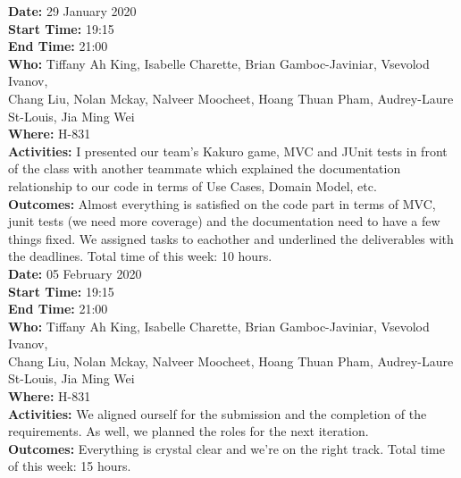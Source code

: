 \documentclass[12pt]{article}
\begin{document}
{\bf Date:} 29 January 2020\\
{\bf Start Time:} 19:15\\
{\bf End Time:} 21:00\\
{\bf Who:} Tiffany Ah King, Isabelle Charette, Brian Gamboc-Javiniar, Vsevolod Ivanov,\\
Chang Liu, Nolan Mckay, Nalveer Moocheet, Hoang Thuan Pham, Audrey-Laure St-Louis, Jia Ming Wei\\
{\bf Where:} H-831\\
{\bf Activities:} I presented our team's Kakuro game, MVC and JUnit tests in front of the class with another teammate which explained the documentation relationship to our code in terms of Use Cases, Domain Model, etc.\\
{\bf Outcomes:} Almost everything is satisfied on the code part in terms of MVC, junit tests (we need more coverage) and the documentation need to have a few things fixed. We assigned tasks to eachother and underlined the deliverables with the deadlines. Total time of this week: 10 hours.\\

{\bf Date:} 05 February 2020\\
{\bf Start Time:} 19:15\\
{\bf End Time:} 21:00\\
{\bf Who:} Tiffany Ah King, Isabelle Charette, Brian Gamboc-Javiniar, Vsevolod Ivanov,\\
Chang Liu, Nolan Mckay, Nalveer Moocheet, Hoang Thuan Pham, Audrey-Laure St-Louis, Jia Ming Wei\\
{\bf Where:} H-831\\
{\bf Activities:} We aligned ourself for the submission and the completion of the requirements. As well, we planned the roles for the next iteration.\\
{\bf Outcomes:} Everything is crystal clear and we're on the right track. Total time of this week: 15 hours.\\


\end{document}

